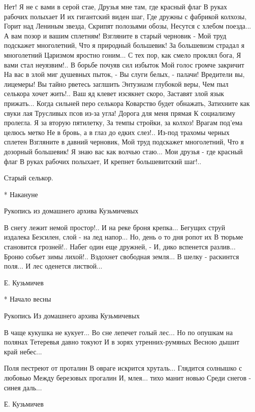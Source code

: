 Нет! Я не с вами в серой стае,
    Друзья мне там, где красный флаг
В руках рабочих полыхает
    И их гигантский виден шаг,
Где дружны с фабрикой колхозы,
    Горит над Лениным звезда,
Скрипят полозьями обозы,
    Несутся с хлебом поезда...
А вам позор и вашим сплетням!
    Взгляните в старый черновик -
Мой труд подскажет многолетний,
    Что я природный большевик!
За большевизм страдал я многолетний
    Царизмом яростно гоним...
С тех пор, как смело проклял бога,
    Я вами стал неуязвим!..
В борьбе почуяв сил избыток
    Мой голос громче закричит
На вас в злой миг душевных пыток, -
    Вы слуги белых, - палачи!
Вредители вы, лицемеры!
    Вы тайно рветесь заглшить
Энтузиазм глубокой веры,
    Чем пыл селькора хочет жить!..
Ваш яд клевет изсякнет скоро,
    Заставят злой язык прижать...
Когда сильней перо селькора
    Коварство будет обнажать,
Затихните как свуки лая
    Трусливых псов из-за угла!
Дорога для меня прямая
    К социализму пролегла.
Я за вторую пятилетку,
    За темпы стройки, за колхоз!
Врагам под'ема целюсь метко
    Не в бровь, а в глаз до едких слез!..
Из-под трахомы черных сплетен
    Взгляните в давний черновик,
Мой труд подскажет многолетний,
    Что я дозорный большевик!
Я знаю вас как волчью стаю...
    Мои друзья - где красный флаг
В руках рабочих полыхает,
    И крепнет большевитский шаг!..

    Старый селькор.

* Накануне

Рукопись из домашнего архива Кузьмичевых

В снегу лежит немой простор!..
    И на реке броня крепка...
    Бегущих струй издалека
Безсилен, слой - на лед напор...
Но, день о то дня ропот их
    В тюрьме становится грозней!..
    Набег один еще дружней, -
И, дико вспенется разлив...
Броню собьет зимы лихой!..
    Вздохнет свободная земля...
    В шелку - раскинтся поля...
И лес оденется листвой...

Е. Кузьмичев


* Начало весны

Рукопись
Из домашнего архива Кузьмичевых

В чаще кукушка не кукует...
    Во сне лепечет голый лес...
Но по опушкам на полянах
Тетеревья давно токуют
И в зорях утренних-румяных
    Весною дышит край небес...

Поля пестреют от проталин
    В овраге искрится хруталь...
Глядится солнышко с любовью
Между березовых прогалин
И, млея... тихо манит новью
    Среди снегов - синея даль...

Е. Кузьмичев
